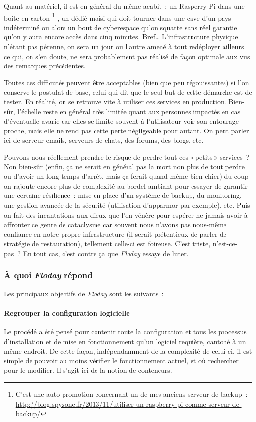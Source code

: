 Quant au matériel, il est en général du même acabit~: un Rasperry Pi dans une boite en carton%
\footnote{C'est une auto-promotion concernant un de mes anciens serveur de backup~: \url{http://blog.spyzone.fr/2013/11/utiliser-un-raspberry-pi-comme-serveur-de-backup/}}%
, un dédié moisi qui doit tourner dans une cave d'un pays indéterminé ou alors un bout de cyberespace qu'on squatte sans réel garantie qu'on y aura encore accès dans cinq minutes.
Bref\dots{} L'infrastructure physique n'étant pas pérenne, on sera un jour ou l'autre amené à tout redéployer ailleurs ce qui, on s'en doute, ne sera probablement pas réalisé de façon optimale aux vus des remarques précédentes.

Toutes ces difficutés peuvent être acceptables (bien que peu régouissantes) si l'on conserve le postulat de base, celui qui dit que le seul but de cette démarche est de tester.
En réalité, on se retrouve vite à utiliser ces services en production.
Bien-sûr, l'échelle reste en général très limitée quant aux personnes impactés en cas d'éventuelle avarie car elles se limite souvent à l'utilisateur voir son entourage proche, mais elle ne rend pas cette perte négligeable pour autant.
On peut parler ici de serveur emails, serveurs de chats, des forums, des blogs, etc.

Pouvons-nous réellement prendre le risque de perdre tout ces «\,petits\,» services~?
Non bien-sûr (enfin, ça ne serait en général pas la mort non plus de tout perdre ou d'avoir un long temps d'arrêt, mais ça ferait quand-même bien chier)
du coup on rajoute encore plus de complexité au bordel ambiant pour essayer de garantir une certaine résilience~: mise en place d'un système de backup, du monitoring, une gestion avancée de la sécurité (utilisation d'apparmor par exemple), etc.
Puis on fait des incantations aux dieux que l'on vénère pour espérer ne jamais avoir à affronter ce genre de cataclysme car souvent nous n'avons pas nous-même confiance en notre propre infrastructure (il serait prétentieux de parler de stratégie de restauration), tellement celle-ci est foireuse.
C'est triste, n'est-ce-pas~? En tout cas, c'est contre ça que \emph{Floday} essaye de luter.

\subsubsection{À quoi \emph{Floday} répond}
Les principaux objectifs de \emph{Floday} sont les suivants~:

\paragraph{Regrouper la configuration logicielle}
Le procédé a été pensé pour contenir toute la configuration et tous les processus d'installation et de mise en fonctionnement qu'un logiciel requière, cantoné à un même endroit.
De cette façon, indépendamment de la complexité de celui-ci, il est simple de pouvoir au moins vérifier le fonctionnement actuel, et où rechercher pour le modifier.
Il s'agit ici de la notion de \glspl{conteneur}.

